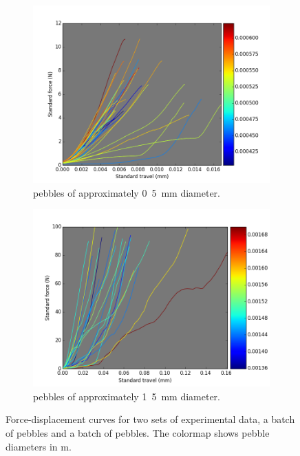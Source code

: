 \begin{figure}
        \centering
        \begin{subfigure}[b]{0.75\textwidth}
                \includegraphics[width=\textwidth]{chapters/figures/fzk-exp-colormap}
                \caption{\lis pebbles of approximately \si{0.5 mm} diameter.}
                \label{fig:fzk-exp-colormap}
        \end{subfigure}
         
        \begin{subfigure}[b]{0.75\textwidth}
                \includegraphics[width=\textwidth]{chapters/figures/nfri-exp-colormap}
                \caption{\lit pebbles of approximately \si{1.5 mm} diameter.}
                \label{fig:nfri-exp-colormap}
        \end{subfigure}
        \caption{Force-displacement curves for two sets of experimental data, a batch of \lis pebbles and a batch of \lit pebbles. The colormap shows pebble diameters in \si{m}.}\label{fig:exp-curves}
\end{figure}

